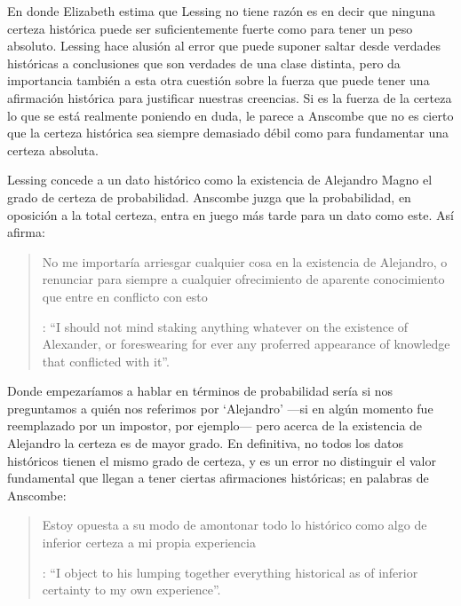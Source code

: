 En donde Elizabeth estima que Lessing no tiene razón es en decir que ninguna certeza histórica puede ser suficientemente fuerte como para tener un peso absoluto. Lessing hace alusión al error que puede suponer saltar desde verdades históricas a conclusiones que son verdades de una clase distinta, pero da importancia también a esta otra cuestión sobre la fuerza que puede tener una afirmación histórica para justificar nuestras creencias. Si es la fuerza de la certeza lo que se está realmente poniendo en duda, le parece a Anscombe que no es cierto que la certeza histórica sea siempre demasiado débil como para fundamentar una certeza absoluta.

Lessing concede a un dato histórico como la existencia de Alejandro Magno el grado de certeza de probabilidad. Anscombe juzga que la probabilidad, en oposición a la total certeza, entra en juego más tarde para un dato como este. Así afirma: \blockquote[{\Cite[26]{anscombe2008faith:prophandmi}}: \enquote{I should not mind staking anything whatever on the existence of Alexander, or foreswearing for ever any proferred appearance of knowledge that conflicted with it}.]{No me importaría arriesgar cualquier cosa en la existencia de Alejandro, o renunciar para siempre a cualquier ofrecimiento de aparente conocimiento que entre en conflicto con esto}. Donde empezaríamos a hablar en términos de probabilidad sería si nos preguntamos a quién nos referimos por `Alejandro' ---si en algún momento fue reemplazado por un impostor, por ejemplo--- pero acerca de la existencia de Alejandro la certeza es de mayor grado. En definitiva, no todos los datos históricos tienen el mismo grado de certeza, y es un error no distinguir el valor fundamental que llegan a tener ciertas afirmaciones históricas; en palabras de Anscombe: \blockquote[{\Cite[27]{anscombe2008faith:prophandmi}}: \enquote{I object to his lumping together everything historical as of inferior certainty to my own experience}.]{Estoy opuesta a su modo de amontonar todo lo histórico como algo de inferior certeza a mi propia experiencia}.

